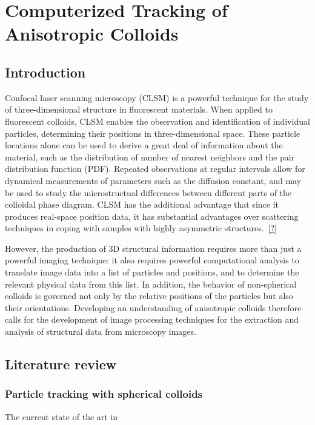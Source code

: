 \chapter{Computerized Tracking of Anisotropic Colloids}
\section{Introduction}

Confocal laser scanning microscopy (CLSM) is a powerful technique for the study of three-dimensional
structure in fluorescent materials. When applied to fluorescent colloids, CLSM enables the observation
and identification of individual particles, determining their positions in three-dimensional space.
These particle locations alone can be used to derive a great deal
of information about the material, such as the distribution of number of nearest neighbors and
the pair distribution function (PDF). Repeated observations at regular intervals allow for dynamical
measurements of parameters such as the diffusion constant, and may be used to study the microstructual
differences between different parts of the colloidal phase diagram. CLSM has the additional advantage
that since it produces real-space position data, it has substantial advantages over scattering techniques
in coping with samples with highly asymmetric structures.~\ref{?}

However, 
the production of 3D structural information requires more than just a powerful imaging technique: it also
requires powerful computational analysis to translate image data into a list of particles and positions, and
to determine the relevant physical data from this list.  In addition, the behavior of non-spherical colloids
is governed not only by the relative positions of the particles but also their orientations. Developing an
understanding of anisotropic colloids
therefore calls for the development of image processing techniques for the extraction and analysis of
structural data from microscopy images.

\section{Literature review}

\subsection{Particle tracking with spherical colloids}

The current state of the art in 

